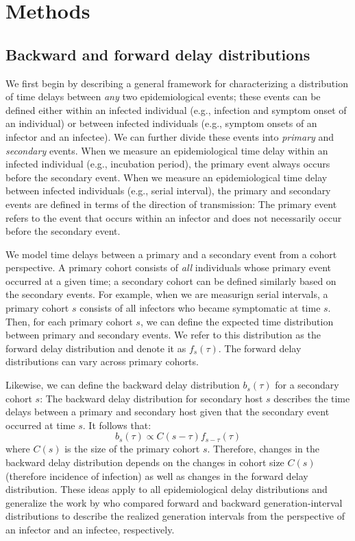 \documentclass[12pt]{article}
\begin{document}
\section{Methods}

\subsection{Backward and forward delay distributions}

We first begin by describing a general framework for characterizing a distribution of time delays between \emph{any} two epidemiological events;
these events can be defined either within an infected individual (e.g., infection and symptom onset of an individual) or between infected individuals (e.g., symptom onsets of an infector and an infectee).
We can further divide these events into \emph{primary} and \emph{secondary} events.
When we measure an epidemiological time delay within an infected individual (e.g., incubation period), the primary event always occurs before the secondary event.
When we measure an epidemiological time delay between infected individuals (e.g., serial interval), 
the primary and secondary events are defined in terms of the direction of transmission:
The primary event refers to the event that occurs within an infector and does not necessarily occur before the secondary event.

We model time delays between a primary and a secondary event from a cohort perspective.
A primary cohort consists of \emph{all} individuals whose primary event occurred at a given time; 
a secondary cohort can be defined similarly based on the secondary events.
For example, when we are measurign serial intervals, a primary cohort $s$ consists of all infectors who became symptomatic at time $s$.
Then, for each primary cohort $s$, we can define the expected time distribution between primary and secondary events.
We refer to this distribution as the forward delay distribution and denote it as $f_s(\tau)$.
The forward delay distributions can vary across primary cohorts.

Likewise, we can define the backward delay distribution $b_s(\tau)$ for a secondary cohort $s$:
The backward delay distribution for secondary host $s$ describes the time delays between a primary and secondary host given that the secondary event occurred at time $s$.
It follows that:
\begin{equation}
b_s(\tau) \propto C(s-\tau) f_{s-\tau}(\tau)
\end{equation}
where $C(s)$ is the size of the primary cohort $s$.
Therefore, changes in the backward delay distribution depends on the changes in cohort size $C(s)$ (therefore incidence of infection) as well as changes in the forward delay distribution.
These ideas apply to all epidemiological delay distributions and generalize the work by \citep{champredon2015intrinsic} who compared forward and backward generation-interval distributions to describe the realized generation intervals from the perspective of an infector and an infectee, respectively.
\end{document}
